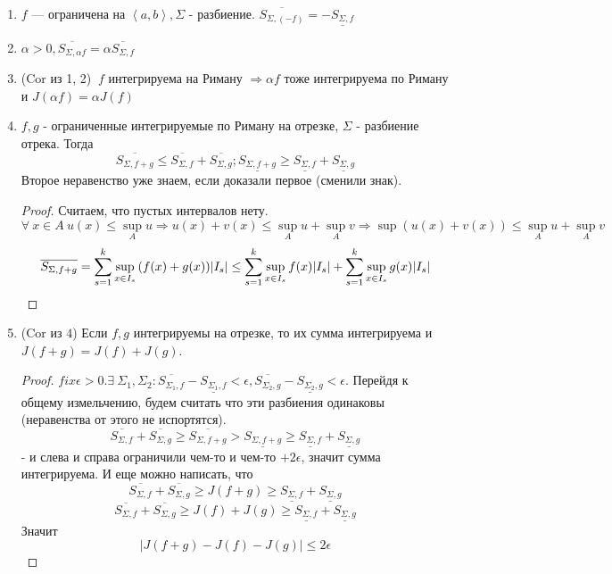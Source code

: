 \documentclass[12pt]{report}
\begin{document}
\begin{prop}
\begin{enumerate}
\item $f$ --- ограничена на $\left<a, b\right>, \Sigma$ - разбиение. $\overline{S_{\Sigma, (-f)}} = -\underline{S_{\Sigma, f}}$

\item $\alpha > 0, \overline{S_{\Sigma, \alpha f}} = \alpha\overline{S_{\Sigma, f}}$

\item (Cor из 1, 2) $~f$ интегрируема на Риману $\Rightarrow \alpha f$ тоже интегрируема по Риману и $J(\alpha f) = \alpha J(f)$

\item $f, g$ - ограниченные интегрируемые по Риману на отрезке,   $\Sigma$ - разбиение отрека. Тогда
$$\overline{S_{\Sigma, f + g}} \le \overline{S_{\Sigma, f}} + \overline{S_{\Sigma, g}}; \underline{S_{\Sigma, f + g}} \ge \underline{S_{\Sigma, f}} + \underline{S_{\Sigma, g}}$$
Второе неравенство уже знаем, если доказали первое (сменили знак).
\begin{proof}
Считаем, что пустых интервалов нету. 
$$\forall ~x \in A ~u(x) \le \sup_{A}{u} \Rightarrow u(x) + v(x) \le \sup_A{u} + \sup_A{v} \Rightarrow\sup{(u(x) + v(x))} \le \sup_A{u} + \sup_A{v}$$
$$\overline{S_{\Sigma, f + g}} = \sum\limits_{s = 1}^k{\sup_{x \in I_s}{(f(x) + g(x))}|I_s|} \le \sum\limits_{s = 1}^k{\sup_{x \in I_s}{f(x)}|I_s|} + \sum\limits_{s = 1}^k{\sup_{x \in I_s}{g(x)}|I_s|}$$
\end{proof}

\item (Cor из $4$) Если $f, g$ интегрируемы на отрезке, то их сумма интегрируема и $J(f + g) = J(f) + J(g)$.
\begin{proof}
$fix \epsilon > 0. \exists ~\Sigma_1, \Sigma_2: \overline{S_{\Sigma_1, f}} - \underline{S_{\Sigma_1, f}} < \epsilon, \overline{S_{\Sigma_2, g}} - \underline{S_{\Sigma_2, g}} < \epsilon$. Перейдя к общему измельчению, будем считать что эти разбиения одинаковы (неравенства от этого не испортятся).
$$\overline{S_{\Sigma, f}} + \overline{S_{\Sigma, g}} \ge \overline{S_{\Sigma, f + g}} > \underline{S_{\Sigma, f + g}}  \ge \underline{S_{\Sigma, f}} + \underline{S_{\Sigma, g}}$$
 - и слева и справа ограничили чем-то и чем-то $+ 2\epsilon$, значит сумма интегрируема. И еще можно написать, что
 $$\overline{S_{\Sigma, f}} + \overline{S_{\Sigma, g}} \ge J(f + g) \ge \underline{S_{\Sigma, f}} + \underline{S_{\Sigma, g}}$$
 $$\overline{S_{\Sigma, f}} + \overline{S_{\Sigma, g}} \ge J(f) + J(g) \ge \underline{S_{\Sigma, f}} + \underline{S_{\Sigma, g}}$$ 
Значит 
$$|J(f + g) - J(f) - J(g)| \le 2\epsilon$$
\end{proof}


\end{enumerate}
\end{prop}
\end{document}
